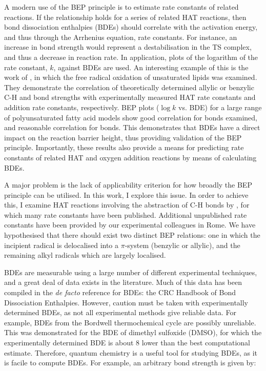 A modern use of the BEP principle is to estimate rate constants of related reactions. If the relationship holds for a series of related HAT reactions, then bond dissociation enthalpies (BDEs) should correlate with the activation energy, and thus through the Arrhenius equation, rate constants. For instance, an increase in bond strength would represent a destabilisation in the TS complex, and thus a decrease in reaction rate. In application, plots of the logarithm of the rate constant, $k$, against BDEs are used. An interesting example of this is the work of \citet{Pratt2003}, in which the free radical oxidation of unsaturated lipids was examined. They demonstrate the correlation of theoretically determined allylic or benzylic C-H and  bond strengths with experimentally measured HAT rate constants and  addition rate constants, respectively. BEP plots ($\log k$ vs. BDE) for a large range of polyunsaturated fatty acid models show good correlation for  bonds examined, and reasonable correlation for  bonds. This demonstrates that BDEs have a direct impact on the reaction barrier height, thus providing validation of the BEP principle. Importantly, these results also provide a means for predicting rate constants of related HAT and oxygen addition reactions by means of calculating BDEs.

A major problem is the lack of applicability criterion for how broadly the BEP principle can be utilised. In this work, I explore this issue. In order to achieve this, I examine HAT reactions involving the abstraction of C-H bonds by \cumo, for which many rate constants have been published.\cite{Bietti2010, Bietti2011, Pischel2001, Salamone2011, Salamone2012, Salamone2012a, Salamone2013, Salamone2015} Additional unpublished rate constants have been provided by our experimental colleagues in Rome. We have hypothesised that there should exist two distinct BEP relations: one in which the incipient radical is delocalised into a $\pi$-system (benzylic or allylic), and the remaining alkyl radicals which are largely localised.


BDEs are measurable using a large number of different experimental techniques, and a great deal of data exists in the literature. Much of this data has been compiled in the \emph{de facto} reference for BDEs: the CRC Handbook of Bond Dissociation Enthalpies.\cite{Luo2002} However, caution must be taken with experimentally determined BDEs, as not all experimental methods give reliable data. For example, BDEs from the Bordwell\cite{Bordwell1988} thermochemical cycle are possibly unreliable.\cite{Salamone2012, Miller2016} This was demonstrated for the BDE of dimethyl sulfoxide (DMSO), for which the experimentally determined BDE is about 8 \kcalmol lower than the best computational estimate.\cite{Salamone2012} Therefore, quantum chemistry is a useful tool for studying BDEs, as it is facile to compute BDEs. For example, an arbitrary  bond strength is given by:

